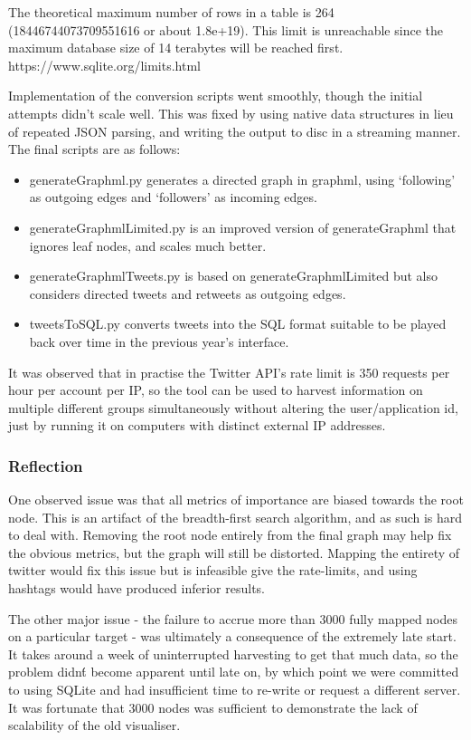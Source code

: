 The theoretical maximum number of rows in a table is 264 (18446744073709551616 or about 1.8e+19). This limit is unreachable since the maximum database size of 14 terabytes will be reached first.
https://www.sqlite.org/limits.html

Implementation of the conversion scripts went smoothly, though the initial attempts didn't scale well. This was fixed by using native data structures in lieu of repeated JSON parsing, and writing the output to disc in a streaming manner. The final scripts are as follows:
\begin{itemize}
\item generateGraphml.py generates a directed graph in graphml, using ‘following' as outgoing edges and ‘followers' as incoming edges.
\item generateGraphmlLimited.py is an improved version of generateGraphml that ignores leaf nodes, and scales much better.
\item generateGraphmlTweets.py is based on generateGraphmlLimited but also considers directed tweets and retweets as outgoing edges.
\item tweetsToSQL.py converts tweets into the SQL format suitable to be played back over time in the previous year's interface.
\end{itemize}

It was observed that in practise the Twitter API's rate limit is 350 requests per hour per account per IP, so the tool can be used to harvest information on multiple different groups simultaneously without altering the user/application id, just by running it on computers with distinct external IP addresses.

\subsubsection{Reflection}
One observed issue was that all metrics of importance are biased towards the root node. This is an artifact of the breadth-first search algorithm, and as such is hard to deal with. Removing the root node entirely from the final graph may help fix the obvious metrics, but the graph will still be distorted. Mapping the entirety of twitter would fix this issue but is infeasible give the rate-limits, and using hashtags would have produced inferior results.

The other major issue - the failure to accrue more than 3000 fully mapped nodes on a particular target - was ultimately a consequence of the extremely late start.  It takes around a week of uninterrupted harvesting to get that much data, so the problem didn\'t become apparent until late on, by which point we were committed to using SQLite and had insufficient time to re-write or request a different server. It was fortunate that 3000 nodes was sufficient to demonstrate the lack of scalability of the old visualiser.

